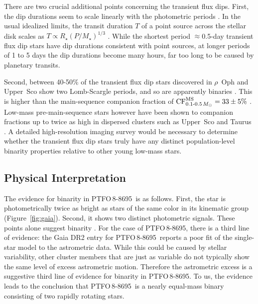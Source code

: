 \documentclass[12pt,twocolumn,tighten]{aastex62}
\newcommand{\ptfo}{PTFO$\,$8-8695}
\begin{document}
There are two crucial additional points concerning the transient flux
dips.  First, the dip durations seem to scale linearly with the
photometric periods \citep[][Figure~26]{stauffer_orbiting_2017}.  In
the usual idealized limits, the transit duration $T$ of a point source
across the stellar disk scales as $T \propto R_\star
(P/M_\star)^{1/3}$ \citep{winn_exoplanet_2010}.  While the shortest
period $\approx$0.5-day transient flux dip stars have dip durations
consistent with point sources, at longer periods of 1 to 5 days the
dip durations become many hours, far too long to be caused by
planetary transits.

Second, between 40-50\% of the transient flux dip stars discovered in
$\rho$~Oph and Upper~Sco show two Lomb-Scargle periods, and so are
apparently binaries \citep[][Table~1]{stauffer_orbiting_2017}.  This
is higher than the main-sequence companion fraction of ${\rm
CF}_{0.1\text{-}0.5\,M_\odot}^{\rm MS} = 33 \pm 5\%$
\citep{henry_solar_2006,duchene_stellar_2013,winters_solar_2019}.
Low-mass pre-main-sequence stars however have been shown to companion
fractions up to twice as high in dispersed clusters such as Upper~Sco
and Taurus \citep{kraus_mapping_2008,kraus_mapping_2011}.  A detailed
high-resolution imaging survey would be necessary to determine whether
the transient flux dip stars truly have any distinct population-level
binarity properties relative to other young low-mass stars.


\subsection{Physical Interpretation}
\label{subsec:physical}

The evidence for binarity in \ptfo\ is as follows.  First, the star is
photometrically twice as bright as stars of the same color in its
kinematic group (Figure~\ref{fig:gaia}).  Second, it shows two
distinct photometric signals.  These points alone suggest binarity
\citep{stauffer_rotevol_2018}.  For the case of \ptfo, there is a
third line of evidence: the Gaia DR2 entry for \ptfo\ reports a poor
fit of the single-star model to the astrometric data.  While this
could be caused by stellar variability, other cluster members that are
just as variable do not typically show the same level of excess
astrometric motion.  Therefore the astrometric excess is a suggestive
third line of evidence for binarity in \ptfo. To us, the evidence
leads to the conclusion that \ptfo\ is a nearly equal-mass binary
consisting of two rapidly rotating stars.
\end{document}
